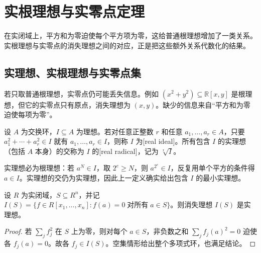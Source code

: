 
\section{实根理想与实零点定理}
\label{b3:sec:G02}

在实闭域上，平方和为零迫使每个平方项为零，这给普通根理想增加了一类关系。实根理想与实零点的消失理想之间的对应，正是把这些额外关系代数化的结果。


\subsection{实理想、实根理想与实零点集}
\label{b3:subsec:G02:01}

若只取普通根理想，实零点仍可能丢失信息。例如 \((x^2+y^2)\subseteq\mathbb R[x,y]\) 是根理想，但它的实零点只有原点，消失理想为 \((x,y)\)。缺少的信息来自“平方和为零迫使每项为零”。

\begin{definition}\label{b3:def:real-ideal}
	设 \(A\) 为交换环，\(I\subseteq A\) 为理想。若对任意正整数 \(r\) 和任意 \(a_1,\ldots,a_r\in A\)，只要 \(a_1^2+\cdots+a_r^2\in I\) 就有 \(a_1,\ldots,a_r\in I\)，则称 \(I\) 为[real ideal]。所有包含 \(I\) 的实理想（包括 \(A\) 本身）的交称为 \(I\) 的[real radical]，记为 \(\sqrt[\mathrm r]{I}\)。
\end{definition}

实理想必为根理想：若 \(a^N\in I\)，取 \(2^e\ge N\)，则 \(a^{2^e}\in I\)，反复用单个平方的条件得 \(a\in I\)。实理想的交仍为实理想，因此上一定义确实给出包含 \(I\) 的最小实理想。

\begin{proposition}\label{b3:prop:real-vanishing-ideal}
	设 \(R\) 为实闭域，\(S\subseteq R^n\)，并记 \(I(S)=\{f\in R[x_1,\ldots,x_n]:f(a)=0\;\text{对所有}\;a\in S\}\)。则消失理想 \(I(S)\) 是实理想。
\end{proposition}
\begin{proof}
	若 \(\sum_j f_j^2\) 在 \(S\) 上为零，则对每个 \(a\in S\)，非负数之和 \(\sum_jf_j(a)^2=0\) 迫使各 \(f_j(a)=0\)。故各 \(f_j\in I(S)\)。空集情形给出整个多项式环，也满足结论。
\end{proof}

